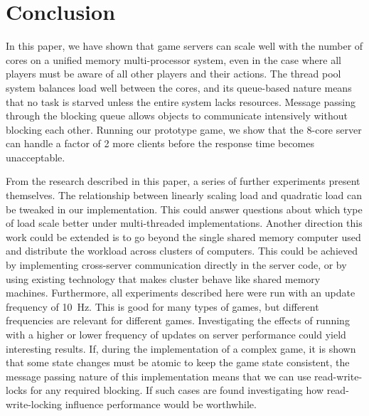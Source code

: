 \section{Conclusion}
\label{sec:conclusion} 

In this paper, we have shown that game servers can scale well with the
number of cores on a unified memory multi-processor system, even in
the case where all players must be aware of all other players and
their actions. The thread pool system balances load well between the
cores, and its queue-based nature means that no task is starved unless
the entire system lacks resources. Message passing through the
blocking queue allows objects to communicate intensively without
blocking each other. Running our prototype game, we show that the
8-core server can handle a factor of 2 more clients before the
response time becomes unacceptable.


From the research described in this paper, a series of further
experiments present themselves.
%
The relationship between linearly scaling load and quadratic load can
be tweaked in our implementation. This could answer questions about
which type of load scale better under multi-threaded implementations.
%
Another direction this work could be extended is to go beyond the
single shared memory computer used and distribute the workload
across clusters of computers. This could be achieved by implementing
cross-server communication directly in the server code, or by using
existing technology that makes cluster behave like shared memory
machines. 
%
Furthermore, all experiments described here were run with an update frequency of
10~Hz. This is good for many types of games, but different frequencies
are relevant for different games. Investigating the effects of running
with a higher or lower frequency of updates on server performance
could yield interesting results.
%
If, during the implementation of a complex game, it is shown that some
state changes must be atomic to keep the game state consistent, the
message passing nature of this implementation means that we can use
read-write-locks for any required blocking. If such cases are found
investigating how read-write-locking influence performance would be
worthwhile.
%
